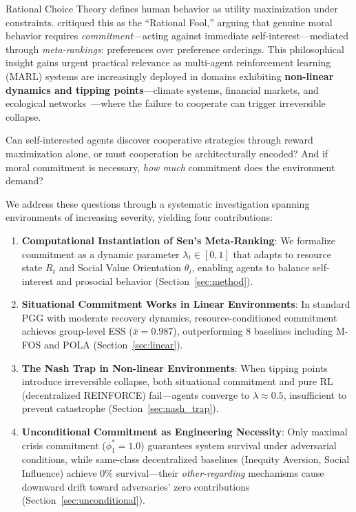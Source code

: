 \documentclass{article}
\begin{document}
Rational Choice Theory defines human behavior as utility maximization under constraints.
\citet{sen1977rational} critiqued this as the ``Rational Fool,'' arguing that genuine moral behavior requires \textit{commitment}---acting against immediate self-interest---mediated through \textit{meta-rankings}: preferences over preference orderings.
This philosophical insight gains urgent practical relevance as multi-agent reinforcement learning (MARL) systems are increasingly deployed in domains exhibiting \textbf{non-linear dynamics and tipping points}---climate systems, financial markets, and ecological networks~\citep{lenton2008tipping}---where the failure to cooperate can trigger irreversible collapse.

Can self-interested agents discover cooperative strategies through reward maximization alone, or must cooperation be architecturally encoded?
And if moral commitment is necessary, \emph{how much} commitment does the environment demand?

We address these questions through a systematic investigation spanning environments of increasing severity, yielding four contributions:
\begin{enumerate}
    \item[(C1)] \textbf{Computational Instantiation of Sen's Meta-Ranking}: We formalize commitment as a dynamic parameter $\lambda_t \in [0,1]$ that adapts to resource state $R_t$ and Social Value Orientation $\theta_i$, enabling agents to balance self-interest and prosocial behavior (Section~\ref{sec:method}).
    \item[(C2)] \textbf{Situational Commitment Works in Linear Environments}: In standard PGG with moderate recovery dynamics, resource-conditioned commitment achieves group-level ESS ($\bar{x}=0.987$), outperforming 8 baselines including M-FOS and POLA (Section~\ref{sec:linear}).
    \item[(C3)] \textbf{The Nash Trap in Non-linear Environments}: When tipping points introduce irreversible collapse, both situational commitment and pure RL (decentralized REINFORCE) fail---agents converge to $\lambda \approx 0.5$, insufficient to prevent catastrophe (Section~\ref{sec:nash_trap}).
    \item[(C4)] \textbf{Unconditional Commitment as Engineering Necessity}: Only maximal crisis commitment ($\phi_1^* = 1.0$) guarantees system survival under adversarial conditions, while same-class decentralized baselines (Inequity Aversion, Social Influence) achieve 0\% survival---their \emph{other-regarding} mechanisms cause downward drift toward adversaries' zero contributions (Section~\ref{sec:unconditional}).
\end{enumerate}
\end{document}
